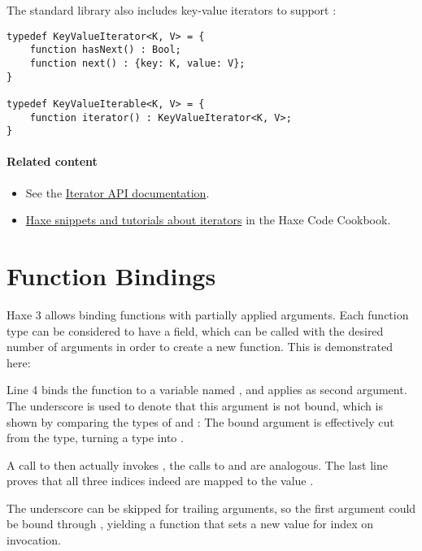 
The standard library also includes key-value iterators to support :

\begin{lstlisting}
typedef KeyValueIterator<K, V> = {
	function hasNext() : Bool;
	function next() : {key: K, value: V};
}

typedef KeyValueIterable<K, V> = {
	function iterator() : KeyValueIterator<K, V>;
}
\end{lstlisting}

\paragraph{Related content}
\begin{itemize}
	\item See the \href{http://api.haxe.org/Iterator.html}{Iterator API documentation}.
	\item \href{http://code.haxe.org/tag/iterator.html}{Haxe snippets and tutorials about iterators} in the Haxe Code Cookbook.
\end{itemize}


\section{Function Bindings}
\label{lf-function-bindings}

Haxe 3 allows binding functions with partially applied arguments. Each function type can be considered to have a  field, which can be called with the desired number of arguments in order to create a new function. This is demonstrated here:

Line 4 binds the function  to a variable named , and applies  as second argument. The underscore \expr{_} is used to denote that this argument is not bound, which is shown by comparing the types of  and : The bound  argument is effectively cut from the type, turning a  type into .

A call to  then actually invokes , the calls to  and  are analogous. The last line proves that all three indices indeed are mapped to the value .

The underscore \expr{_} can be skipped for trailing arguments, so the first argument could be bound through , yielding a  function that sets a new value for index  on invocation.

